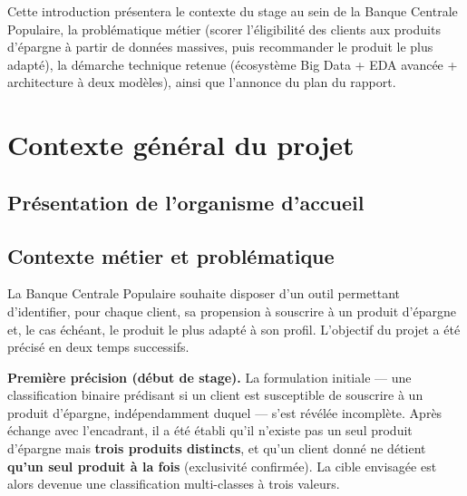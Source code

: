 \documentclass[11pt,a4paper]{report}
\begin{document}
Cette introduction présentera le contexte du stage au sein de la Banque
Centrale Populaire, la problématique métier (scorer l'éligibilité des
clients aux produits d'épargne à partir de données massives, puis
recommander le produit le plus adapté), la démarche technique retenue
(écosystème Big Data + EDA avancée + architecture à deux modèles), ainsi
que l'annonce du plan du rapport.


\chapter{Contexte général du projet}
\statutFait

\section{Présentation de l'organisme d'accueil}

\section{Contexte métier et problématique}
La Banque Centrale Populaire souhaite disposer d'un outil permettant
d'identifier, pour chaque client, sa propension à souscrire à un produit
d'épargne et, le cas échéant, le produit le plus adapté à son profil.
L'objectif du projet a été précisé en deux temps successifs.

\textbf{Première précision (début de stage).} La formulation initiale —
une classification binaire prédisant si un client est susceptible de
souscrire à \og un \fg{} produit d'épargne, indépendamment duquel — s'est
révélée incomplète. Après échange avec l'encadrant, il a été établi qu'il
n'existe pas un seul produit d'épargne mais \textbf{trois produits
distincts}, et qu'un client donné ne détient \textbf{qu'un seul produit à
la fois} (exclusivité confirmée). La cible envisagée est alors devenue une
classification multi-classes à trois valeurs.
\end{document}
